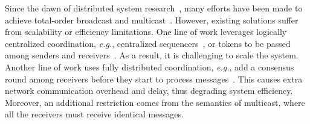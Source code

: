 
Since the dawn of distributed system research~\cite{lamport1978time}, many efforts have been made to achieve total-order broadcast and multicast~\cite{defago2004total}.
However, existing solutions suffer from scalability or efficiency limitations.
One line of work leverages logically centralized coordination, \textit{e.g.}, centralized sequencers~\cite{eris}, or tokens to be passed among senders and receivers~\cite{rajagopalan1989token,kim1997total,ekwall2004token}.
As a result, it is challenging to scale the system.
Another line of work uses fully distributed coordination, \textit{e.g.}, add a consensus round among receivers before they start to process messages~\cite{lamport1978time,chandra1996unreliable}.
This causes extra network communication overhead and delay, thus degrading system efficiency.
Moreover, an additional restriction comes from the semantics of multicast, where all the receivers must receive identical messages.

